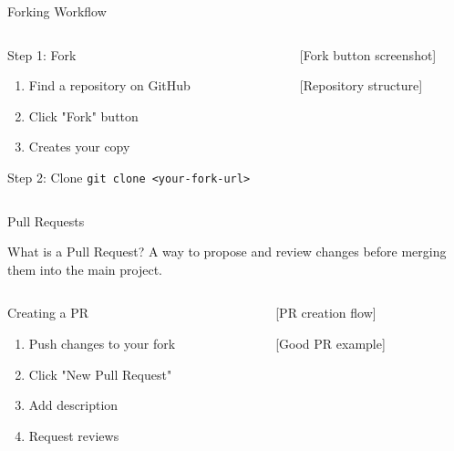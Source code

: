 \documentclass[aspectratio=169]{beamer}
\begin{document}
\begin{frame}{Forking Workflow}
  \begin{columns}
    \begin{column}{0.48\textwidth}
      \begin{block}{Step 1: Fork}
        \begin{enumerate}
          \item Find a repository on GitHub
          \item Click "Fork" button
          \item Creates your copy
        \end{enumerate}
      \end{block}
      
      \begin{block}{Step 2: Clone}
        \texttt{git clone <your-fork-url>}
      \end{block}
    \end{column}
    
    \begin{column}{0.48\textwidth}
      \begin{center}
        [Fork button screenshot]
        
        \vspace{1em}
        [Repository structure]
      \end{center}
    \end{column}
  \end{columns}
\end{frame}

\begin{frame}{Pull Requests}
  \begin{block}{What is a Pull Request?}
    A way to propose and review changes before merging them into the main project.
  \end{block}
  
  \begin{columns}
    \begin{column}{0.48\textwidth}
      \begin{block}{Creating a PR}
        \begin{enumerate}
          \item Push changes to your fork
          \item Click "New Pull Request"
          \item Add description
          \item Request reviews
        \end{enumerate}
      \end{block}
    \end{column}
    
    \begin{column}{0.48\textwidth}
      \begin{center}
        [PR creation flow]
        
        \vspace{1em}
        [Good PR example]
      \end{center}
    \end{column}
  \end{columns}
\end{frame}
\end{document}
